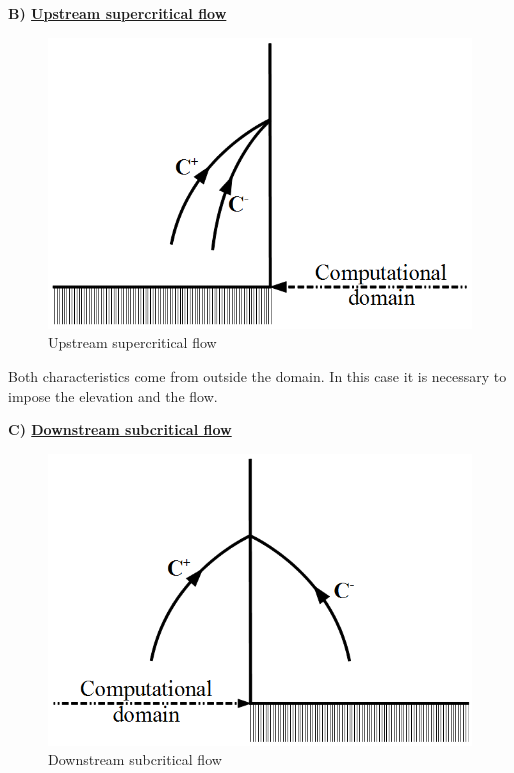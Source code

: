 \newpage

\textbf{B) \underline{Upstream supercritical flow}}

\vspace{0.5cm}

\begin{figure}[h]
 \begin{center}
  \includegraphics[scale=1.]{Figures/AmontTorrentiel.eps}
  \caption{Upstream supercritical flow}
 \end{center}
\end{figure}

Both characteristics come from outside the domain. In this case it is necessary to impose the elevation and the flow.

\vspace{0.5cm}

\textbf{C) \underline{Downstream subcritical flow}}

\vspace{0.5cm}

\begin{figure}[h]
 \begin{center}
  \includegraphics[scale=1.]{Figures/AvalFluvial.eps}
  \caption{Downstream subcritical flow}
 \end{center}
\end{figure}

